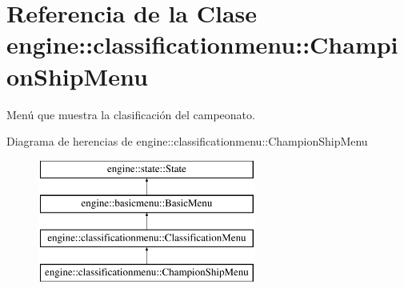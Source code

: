 \hypertarget{classengine_1_1classificationmenu_1_1ChampionShipMenu}{
\section{\-Referencia de la \-Clase engine\-:\-:classificationmenu\-:\-:\-Champion\-Ship\-Menu}
\label{classengine_1_1classificationmenu_1_1ChampionShipMenu}
}


\-Menú que muestra la clasificación del campeonato.  


\-Diagrama de herencias de engine\-:\-:classificationmenu\-:\-:\-Champion\-Ship\-Menu\begin{figure}[H]
\begin{center}
\leavevmode
\includegraphics[height=4.000000cm]{classengine_1_1classificationmenu_1_1ChampionShipMenu}
\end{center}
\end{figure}
